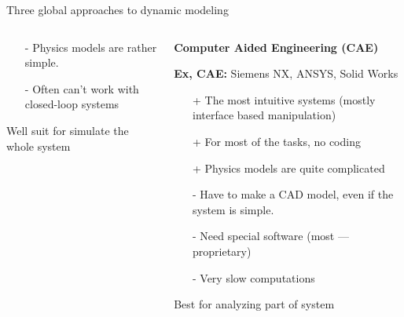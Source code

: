 \documentclass[aspectratio=169]{beamer}
\begin{document}
\begin{frame}[t]{Three global approaches to dynamic modeling}
\begin{columns}[T,onlytextwidth]
\begin{column}{0.33\textwidth}
\begin{itemize}
                \item[-] Physics models are rather simple. 
                \item[-] Often can't work with closed-loop systems
            \end{itemize}
            \alert{Well suit for simulate the whole system}
        \end{column}
        \begin{column}{0.33\textwidth}
            \begin{center}
                \textbf{Computer Aided Engineering (CAE)}
            \end{center}
            \vspace{-0.3cm}
            \textbf{Ex, CAE:} Siemens NX, ANSYS, Solid Works
            \begin{itemize}
                \item[+] The most intuitive systems (mostly interface based manipulation)
                \item[+] For most of the tasks, no coding
                \item[+] Physics models are quite complicated
                \item[-] Have to make a CAD model, even if the system is simple.
                \item[-] Need special software (most --- proprietary)
                \item[-] Very slow computations
            \end{itemize}
            \alert{Best for analyzing part of system}
        \end{column}
    \end{columns}
\end{frame}
\end{document}
